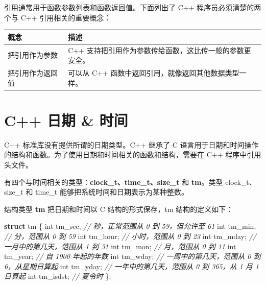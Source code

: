 \documentclass[
]{article}
\newenvironment{Shaded}{}{}
\newcommand{\CommentTok}[1]{\textcolor[rgb]{0.38,0.63,0.69}{\textit{#1}}}
\newcommand{\DataTypeTok}[1]{\textcolor[rgb]{0.56,0.13,0.00}{#1}}
\newcommand{\KeywordTok}[1]{\textcolor[rgb]{0.00,0.44,0.13}{\textbf{#1}}}
\newcommand{\NormalTok}[1]{#1}
\newcommand{\OperatorTok}[1]{\textcolor[rgb]{0.40,0.40,0.40}{#1}}
\begin{document}
引用通常用于函数参数列表和函数返回值。下面列出了 C++
程序员必须清楚的两个与 C++ 引用相关的重要概念：

\begin{longtable}[]{@{}ll@{}}
\toprule
概念 & 描述 \\
\midrule
\endhead
把引用作为参数 & C++
支持把引用作为参数传给函数，这比传一般的参数更安全。 \\
把引用作为返回值 & 可以从 C++
函数中返回引用，就像返回其他数据类型一样。 \\
\bottomrule
\end{longtable}

\hypertarget{c-ux65e5ux671f-ux65f6ux95f4}{%
\section{C++ 日期 \& 时间}\label{c-ux65e5ux671f-ux65f6ux95f4}}

C++ 标准库没有提供所谓的日期类型。C++ 继承了 C
语言用于日期和时间操作的结构和函数。为了使用日期和时间相关的函数和结构，需要在
C++ 程序中引用 头文件。

有四个与时间相关的类型：\textbf{clock\_t、time\_t、size\_t} 和
\textbf{tm}。类型 clock\_t、size\_t 和 time\_t
能够把系统时间和日期表示为某种整数。

结构类型 \textbf{tm} 把日期和时间以 C 结构的形式保存，tm
结构的定义如下：

\begin{Shaded}
\begin{Highlighting}[]
\KeywordTok{struct}\NormalTok{ tm }\OperatorTok{\{}
  \DataTypeTok{int}\NormalTok{ tm\_sec}\OperatorTok{;}   \CommentTok{// 秒，正常范围从 0 到 59，但允许至 61}
  \DataTypeTok{int}\NormalTok{ tm\_min}\OperatorTok{;}   \CommentTok{// 分，范围从 0 到 59}
  \DataTypeTok{int}\NormalTok{ tm\_hour}\OperatorTok{;}  \CommentTok{// 小时，范围从 0 到 23}
  \DataTypeTok{int}\NormalTok{ tm\_mday}\OperatorTok{;}  \CommentTok{// 一月中的第几天，范围从 1 到 31}
  \DataTypeTok{int}\NormalTok{ tm\_mon}\OperatorTok{;}   \CommentTok{// 月，范围从 0 到 11}
  \DataTypeTok{int}\NormalTok{ tm\_year}\OperatorTok{;}  \CommentTok{// 自 1900 年起的年数}
  \DataTypeTok{int}\NormalTok{ tm\_wday}\OperatorTok{;}  \CommentTok{// 一周中的第几天，范围从 0 到 6，从星期日算起}
  \DataTypeTok{int}\NormalTok{ tm\_yday}\OperatorTok{;}  \CommentTok{// 一年中的第几天，范围从 0 到 365，从 1 月 1 日算起}
  \DataTypeTok{int}\NormalTok{ tm\_isdst}\OperatorTok{;} \CommentTok{// 夏令时}
\OperatorTok{\};}
\end{Highlighting}
\end{Shaded}
\end{document}
